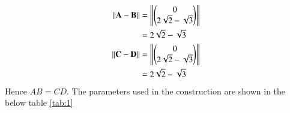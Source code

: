 \documentclass[journal,12pt,twocolumn]{IEEEtran}
\begin{document}
\begin{enumerate}
\begin{align}
\left\lVert\mathbf{A}-\mathbf{B}\right\rVert &= \left\lVert\begin{pmatrix}0 \\ 2\sqrt{2}-\sqrt{3}\end{pmatrix}\right\rVert\\
&=  2\sqrt{2}-\sqrt{3}\\
\left\lVert\mathbf{C}-\mathbf{D}\right\rVert &= \left\lVert\begin{pmatrix}0 \\ 2\sqrt{2}-\sqrt{3}\end{pmatrix}\right\rVert\\
&=  2\sqrt{2}-\sqrt{3}
\end{align}
Hence $AB = CD$.
The parameters used in the construction are shown in the below table \ref{tab:1}

\begin{table}[h]
\centering

\caption{}
\label{tab:1}
\end{table}
\end{enumerate}
\end{document}
